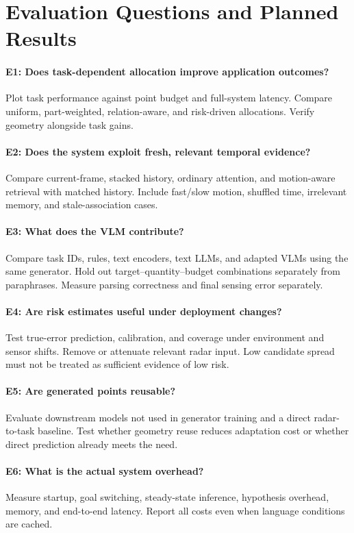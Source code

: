 \section{Evaluation Questions and Planned Results}
\label{sec:evaluation}
\paragraph{E1: Does task-dependent allocation improve application outcomes?}
Plot task performance against point budget and full-system latency. Compare uniform, part-weighted, relation-aware, and risk-driven allocations. Verify geometry alongside task gains.

\paragraph{E2: Does the system exploit fresh, relevant temporal evidence?}
Compare current-frame, stacked history, ordinary attention, and motion-aware retrieval with matched history. Include fast/slow motion, shuffled time, irrelevant memory, and stale-association cases.

\paragraph{E3: What does the VLM contribute?}
Compare task IDs, rules, text encoders, text LLMs, and adapted VLMs using the same generator. Hold out target--quantity--budget combinations separately from paraphrases. Measure parsing correctness and final sensing error separately.

\paragraph{E4: Are risk estimates useful under deployment changes?}
Test true-error prediction, calibration, and coverage under environment and sensor shifts. Remove or attenuate relevant radar input. Low candidate spread must not be treated as sufficient evidence of low risk.

\paragraph{E5: Are generated points reusable?}
Evaluate downstream models not used in generator training and a direct radar-to-task baseline. Test whether geometry reuse reduces adaptation cost or whether direct prediction already meets the need.

\paragraph{E6: What is the actual system overhead?}
Measure startup, goal switching, steady-state inference, hypothesis overhead, memory, and end-to-end latency. Report all costs even when language conditions are cached.

